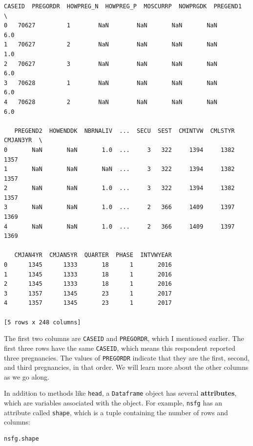 \begin{lstlisting}[style=output]
   CASEID  PREGORDR  HOWPREG_N  HOWPREG_P  MOSCURRP  NOWPRGDK  PREGEND1  \
0   70627         1        NaN        NaN       NaN       NaN       6.0   
1   70627         2        NaN        NaN       NaN       NaN       1.0   
2   70627         3        NaN        NaN       NaN       NaN       6.0   
3   70628         1        NaN        NaN       NaN       NaN       6.0   
4   70628         2        NaN        NaN       NaN       NaN       6.0   

   PREGEND2  HOWENDDK  NBRNALIV  ...  SECU  SEST  CMINTVW  CMLSTYR  CMJAN3YR  \
0       NaN       NaN       1.0  ...     3   322     1394     1382      1357   
1       NaN       NaN       NaN  ...     3   322     1394     1382      1357   
2       NaN       NaN       1.0  ...     3   322     1394     1382      1357   
3       NaN       NaN       1.0  ...     2   366     1409     1397      1369   
4       NaN       NaN       1.0  ...     2   366     1409     1397      1369   

   CMJAN4YR  CMJAN5YR  QUARTER  PHASE  INTVWYEAR  
0      1345      1333       18      1       2016  
1      1345      1333       18      1       2016  
2      1345      1333       18      1       2016  
3      1357      1345       23      1       2017  
4      1357      1345       23      1       2017  

[5 rows x 248 columns]
\end{lstlisting}

The first two columns are \passthrough{\lstinline!CASEID!} and
\passthrough{\lstinline!PREGORDR!}, which I mentioned earlier. The first
three rows have the same \passthrough{\lstinline!CASEID!}, which means
this respondent reported three pregnancies. The values of
\passthrough{\lstinline!PREGORDR!} indicate that they are the first,
second, and third pregnancies, in that order. We will learn more about
the other columns as we go along.

In addition to methods like \passthrough{\lstinline!head!}, a
\passthrough{\lstinline!Dataframe!} object has several
\textbf{attributes}, which are variables associated with the object. For
example, \passthrough{\lstinline!nsfg!} has an attribute called
\passthrough{\lstinline!shape!}, which is a tuple containing the number
of rows and columns:

\begin{lstlisting}[language=Python,style=source]
nsfg.shape
\end{lstlisting}

